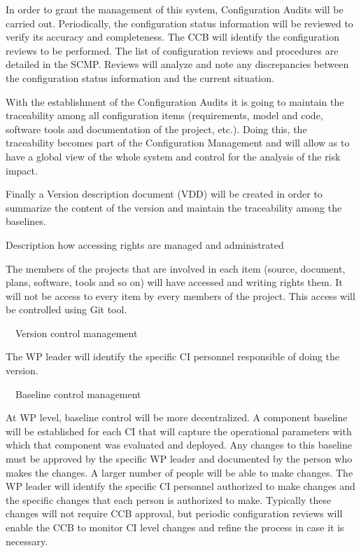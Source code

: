 \documentclass{template/openetcs_article}
\begin{document}
In order to grant the management of this system, Configuration Audits will be carried out. Periodically, the configuration status information will be reviewed to verify its accuracy and completeness.  The CCB will identify the configuration reviews to be performed. The list of configuration reviews and procedures are detailed in the SCMP. Reviews will analyze and note any discrepancies between the configuration status information and the current situation.

With the establishment of the Configuration Audits it is going to maintain the traceability among all configuration items (requirements, model and code, software tools and documentation of the project, etc.). Doing this, the traceability becomes part of the Configuration Management and will allow as to have a global view of the whole system and control for the analysis of the risk impact.


Finally a Version description document (VDD) will be created in order to summarize the content of the version and maintain the traceability among the baselines.

Description how accessing rights are managed and administrated

The members of the projects that are involved in each item (source, document, plans, software, tools and so on) will have accessed and writing rights them. It will not be access to every item by every members of the project. This access will be controlled using Git tool.



{\textbullet}\ \ Version control management

The WP leader will identify the specific CI personnel responsible of doing the version.



{\textbullet}\ \ Baseline control management

At WP level, baseline control will be more decentralized.  A component baseline will be established for each CI that will capture the operational parameters with which that component was evaluated and deployed.  Any changes to this baseline must be approved by the specific WP leader and documented by the person who makes the changes. A larger number of people will be able to make changes. The WP leader will identify the specific CI personnel authorized to make changes and the specific changes that each person is authorized to make. Typically these changes will not require CCB approval, but periodic configuration reviews will enable the CCB to monitor CI level changes and refine the process in case it is necessary.
\end{document}
